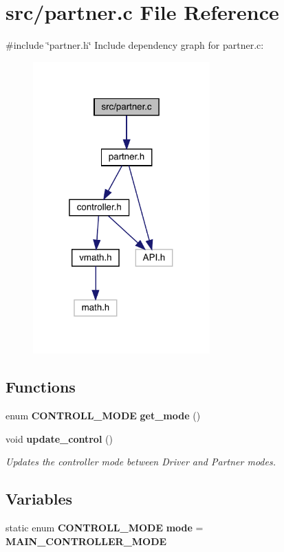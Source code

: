 \section{src/partner.c File Reference}
\label{partner_8c}
{\ttfamily \#include \char`\"{}partner.\+h\char`\"{}}\newline
Include dependency graph for partner.\+c\+:
\nopagebreak
\begin{figure}[H]
\begin{center}
\leavevmode
\includegraphics[width=193pt]{partner_8c__incl}
\end{center}
\end{figure}
\subsection*{Functions}
\begin{DoxyCompactItemize}
\item 
enum \textbf{ C\+O\+N\+T\+R\+O\+L\+L\+\_\+\+M\+O\+DE} \textbf{ get\+\_\+mode} ()
\item 
void \textbf{ update\+\_\+control} ()
\begin{DoxyCompactList}\small\item\em Updates the controller mode between Driver and Partner modes. \end{DoxyCompactList}\end{DoxyCompactItemize}
\subsection*{Variables}
\begin{DoxyCompactItemize}
\item 
static enum \textbf{ C\+O\+N\+T\+R\+O\+L\+L\+\_\+\+M\+O\+DE} \textbf{ mode} = \textbf{ M\+A\+I\+N\+\_\+\+C\+O\+N\+T\+R\+O\+L\+L\+E\+R\+\_\+\+M\+O\+DE}
\end{DoxyCompactItemize}


